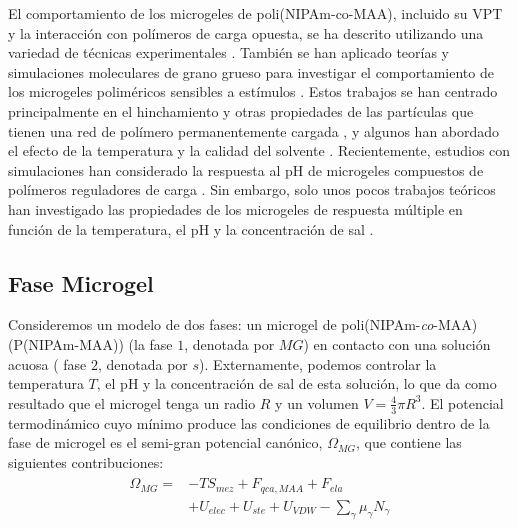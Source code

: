El comportamiento de los microgeles de poli(NIPAm-co-MAA), incluido su VPT y la interacci\'on con pol\'imeros de carga opuesta, se ha descrito utilizando una variedad de t\'ecnicas experimentales \cite{Hoare2004,Dowding2000,Kleinen2008,Kleinen2010, Giussi2015, Su2016,Giussi2020}.
Tambi\'en se han aplicado teor\'ias  y simulaciones moleculares de grano grueso para investigar el comportamiento de los microgeles polim\'ericos sensibles a est\'imulos \cite{quesada2011gel,ahualli2016coarse,Landsgesell2019SM}.
Estos trabajos se han centrado principalmente en el hinchamiento y otras propiedades de las part\'iculas que tienen una red de pol\'imero permanentemente cargada , y algunos han abordado el efecto de la temperatura y la calidad del solvente \cite{Jha2011, QuesadaPerez2013, moncho-jorda2016a, ahualli2016coarse, AdroherBenitez2017PCCP}.
Recientemente, estudios  con simulaciones han considerado la respuesta al pH de microgeles compuestos de pol\'imeros reguladores de carga \cite{Schroeder2015,Rud2017,Sean2018, Hofzumahaus2018,Lu2019}.
Sin embargo, solo unos pocos trabajos te\'oricos han investigado las propiedades de los microgeles de respuesta m\'ultiple en funci\'on de la temperatura, el pH y la concentración de sal  \cite{CaprilesGonzalez2008,polotsky2013collapse}.


\subsection{Fase Microgel}\label{sec:theory}


Consideremos un modelo de dos fases: un microgel de poli(NIPAm-\emph{co}-MAA) (P(NIPAm-MAA)) (la fase $1$, denotada por $MG$) en contacto con una soluci\'on acuosa ( fase $2$, denotada por $s$).
Externamente, podemos controlar la temperatura $T$, el pH y la concentraci\'on de sal de esta soluci\'on, lo que da como resultado que el microgel tenga un radio $R$ y un volumen $V=\frac{4}{3}\pi R^3$.
El potencial termodin\'amico cuyo m\'inimo produce las condiciones de equilibrio dentro de la fase de microgel es el semi-gran potencial can\'onico, $\Omega_{MG}$, que contiene las siguientes contribuciones:
%
\begin{align}
    \begin{aligned}
       \Omega_{MG}=& -TS_{mez} + F_{qca,MAA} +  F_{ela}\\
       & + U_{elec}+  U_{ste} + U_{VDW} -{\sum_{\gamma}
        {\mu_\gamma N_\gamma}}
    \end{aligned}
    \label{eq:free-energy-implicit}
\end{align}
%

